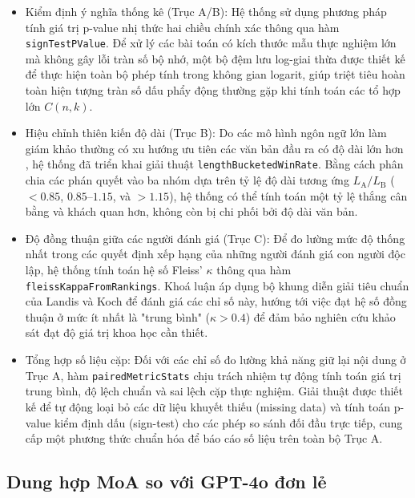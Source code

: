 \begin{itemize}
  \item Kiểm định ý nghĩa thống kê (Trục A/B): Hệ thống sử dụng phương pháp tính giá trị p-value nhị thức hai chiều chính xác thông qua hàm \texttt{signTestPValue}. Để xử lý các bài toán có kích thước mẫu thực nghiệm lớn mà không gây lỗi tràn số bộ nhớ, một bộ đệm lưu log-giai thừa được thiết kế để thực hiện toàn bộ phép tính trong không gian logarit, giúp triệt tiêu hoàn toàn hiện tượng tràn số dấu phẩy động thường gặp khi tính toán các tổ hợp lớn $C(n, k)$.
  \item Hiệu chỉnh thiên kiến độ dài (Trục B): Do các mô hình ngôn ngữ lớn làm giám khảo thường có xu hướng ưu tiên các văn bản đầu ra có độ dài lớn hơn \cite{Dubois2024}, hệ thống đã triển khai giải thuật \texttt{length}\allowbreak\texttt{Bucketed}\allowbreak\texttt{WinRate}. Bằng cách phân chia các phán quyết vào ba nhóm dựa trên tỷ lệ độ dài tương ứng $L_{\text{A}}/L_{\text{B}}$ ($<0.85$, $0.85$--$1.15$, và $>1.15$), hệ thống có thể tính toán một tỷ lệ thắng cân bằng và khách quan hơn, không còn bị chi phối bởi độ dài văn bản.
  \item Độ đồng thuận giữa các người đánh giá (Trục C): Để đo lường mức độ thống nhất trong các quyết định xếp hạng của những người đánh giá con người độc lập, hệ thống tính toán hệ số Fleiss' $\kappa$ thông qua hàm \texttt{fleiss}\allowbreak\texttt{Kappa}\allowbreak\texttt{From}\allowbreak\texttt{Rankings}. Khoá luận áp dụng bộ khung diễn giải tiêu chuẩn của Landis và Koch \cite{Landis1977} để đánh giá các chỉ số này, hướng tới việc đạt hệ số đồng thuận ở mức ít nhất là "trung bình" ($\kappa > 0.4$) để đảm bảo nghiên cứu khảo sát đạt độ giá trị khoa học cần thiết.
  \item Tổng hợp số liệu cặp: Đối với các chỉ số đo lường khả năng giữ lại nội dung ở Trục A, hàm \texttt{paired}\allowbreak\texttt{Metric}\allowbreak\texttt{Stats} chịu trách nhiệm tự động tính toán giá trị trung bình, độ lệch chuẩn và sai lệch cặp thực nghiệm. Giải thuật được thiết kế để tự động loại bỏ các dữ liệu khuyết thiếu (missing data) và tính toán p-value kiểm định dấu (sign-test) cho các phép so sánh đối đầu trực tiếp, cung cấp một phương thức chuẩn hóa để báo cáo số liệu trên toàn bộ Trục A.
\end{itemize}

\subsection{Dung hợp MoA so với GPT-4o đơn lẻ}

